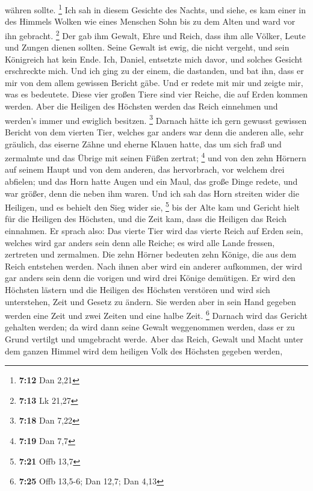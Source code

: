 währen sollte. \footnote{\textbf{7:12} Dan 2,21}  Ich sah
in diesem Gesichte des Nachts, und siehe, es kam einer in des Himmels
Wolken wie eines Menschen Sohn bis zu dem Alten und ward vor ihn
gebracht. \footnote{\textbf{7:13} Lk 21,27}  Der gab ihm
Gewalt, Ehre und Reich, dass ihm alle Völker, Leute und Zungen dienen
sollten. Seine Gewalt ist ewig, die nicht vergeht, und sein Königreich
hat kein Ende.  Ich, Daniel, entsetzte mich davor, und
solches Gesicht erschreckte mich.  Und ich ging zu der
einem, die dastanden, und bat ihn, dass er mir von dem allem gewissen
Bericht gäbe. Und er redete mit mir und zeigte mir, was es bedeutete.
 Diese vier großen Tiere sind vier Reiche, die auf Erden
kommen werden.  Aber die Heiligen des Höchsten werden das
Reich einnehmen und werden's immer und ewiglich besitzen. \footnote{\textbf{7:18}
  Dan 7,22}  Darnach hätte ich gern gewusst gewissen
Bericht von dem vierten Tier, welches gar anders war denn die anderen
alle, sehr gräulich, das eiserne Zähne und eherne Klauen hatte, das um
sich fraß und zermalmte und das Übrige mit seinen Füßen zertrat;
\footnote{\textbf{7:19} Dan 7,7}  und von den zehn Hörnern
auf seinem Haupt und von dem anderen, das hervorbrach, vor welchem drei
abfielen; und das Horn hatte Augen und ein Maul, das große Dinge redete,
und war größer, denn die neben ihm waren.  Und ich sah das
Horn streiten wider die Heiligen, und es behielt den Sieg wider sie,
\footnote{\textbf{7:21} Offb 13,7}  bis der Alte kam und
Gericht hielt für die Heiligen des Höchsten, und die Zeit kam, dass die
Heiligen das Reich einnahmen.  Er sprach also: Das vierte
Tier wird das vierte Reich auf Erden sein, welches wird gar anders sein
denn alle Reiche; es wird alle Lande fressen, zertreten und zermalmen.
 Die zehn Hörner bedeuten zehn Könige, die aus dem Reich
entstehen werden. Nach ihnen aber wird ein anderer aufkommen, der wird
gar anders sein denn die vorigen und wird drei Könige demütigen.
 Er wird den Höchsten lästern und die Heiligen des Höchsten
verstören und wird sich unterstehen, Zeit und Gesetz zu ändern. Sie
werden aber in sein Hand gegeben werden eine Zeit und zwei Zeiten und
eine halbe Zeit. \footnote{\textbf{7:25} Offb 13,5-6; Dan 12,7; Dan 4,13}
 Darnach wird das Gericht gehalten werden; da wird dann
seine Gewalt weggenommen werden, dass er zu Grund vertilgt und
umgebracht werde.  Aber das Reich, Gewalt und Macht unter
dem ganzen Himmel wird dem heiligen Volk des Höchsten gegeben werden,
